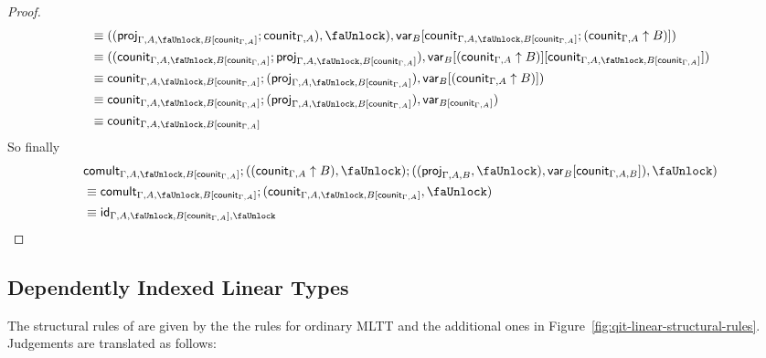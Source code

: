 \documentclass[10pt]{article}
\theoremstyle{definition}
\newcommand{\id}{\mathsf{id}}
\newcommand\proj[1]{\ensuremath{\mathsf{proj}_{#1}}}
\newcommand\qvar[1]{\ensuremath{\mathsf{var}_{#1}}}
\newcommand{\lock}{\text{\faUnlock}}
\newcommand{\counit}[1]{\mathsf{counit}_{#1}}
\newcommand{\comult}[1]{\mathsf{comult}_{#1}}
\begin{document}
\begin{proof}
\begin{align*}
&\equiv ((\proj{\Gamma, A, \lock, B[\counit{\Gamma, A}]};\counit{\Gamma, A}), \lock), \qvar{B}[\counit{\Gamma, A, \lock, B[\counit{\Gamma, A}]};(\counit{\Gamma, A} \uparrow B)]) \\
&\equiv ((\counit{\Gamma, A, \lock, B[\counit{\Gamma, A}]};\proj{\Gamma, A, \lock, B[\counit{\Gamma, A}]}), \qvar{B}[(\counit{\Gamma, A} \uparrow B)][\counit{\Gamma, A, \lock, B[\counit{\Gamma, A}]}]) \\
&\equiv \counit{\Gamma, A, \lock, B[\counit{\Gamma, A}]}; (\proj{\Gamma, A, \lock, B[\counit{\Gamma, A}]}), \qvar{B}[(\counit{\Gamma, A} \uparrow B)]) \\
&\equiv \counit{\Gamma, A, \lock, B[\counit{\Gamma, A}]}; (\proj{\Gamma, A, \lock, B[\counit{\Gamma, A}]}), \qvar{B[\counit{\Gamma, A}]}) \\
&\equiv \counit{\Gamma, A, \lock, B[\counit{\Gamma, A}]}
\end{align*}
So finally
\begin{align*}
&\comult{\Gamma, A, \lock, B[\counit{\Gamma, A}]};((\counit{\Gamma, A} \uparrow B), \lock);((\proj{\Gamma, A, B}, \lock), \qvar{B}[\counit{\Gamma, A,B}]), \lock) \\
&\equiv \comult{\Gamma, A, \lock, B[\counit{\Gamma, A}]};(\counit{\Gamma, A, \lock, B[\counit{\Gamma, A}]}, \lock) \\
&\equiv \id_{\Gamma, A, \lock, B[\counit{\Gamma, A}], \lock}
\end{align*}
\end{proof}

\subsection{Dependently Indexed Linear Types}

The structural rules of  are given by the the rules for ordinary MLTT and the additional ones in Figure~\ref{fig:qit-linear-structural-rules}. Judgements are translated as follows:
\end{document}
